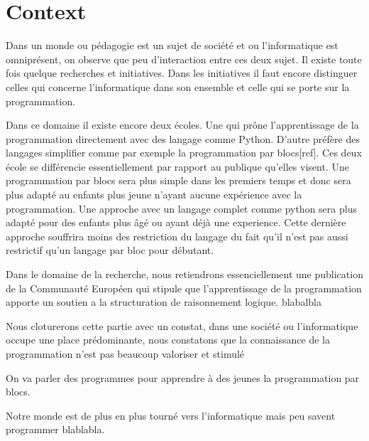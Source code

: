 \section{Context}
\label{intro-context}
Dans un monde ou pédagogie est un sujet de société et ou l'informatique est omniprésent, on observe que peu d'interaction entre ces deux sujet. Il existe toute fois quelque recherches et initiatives. Dans les initiatives il faut encore distinguer celles qui concerne l'informatique dans son ensemble et celle qui se porte sur la programmation.

Dans ce domaine il existe encore deux écoles. Une qui prône l'apprentissage de la programmation directement avec des langage comme Python. D'autre préfère des langages simplifier comme par exemple la programmation par blocs[ref]. Ces deux école se différencie essentiellement par rapport au publique qu'elles visent. Une programmation par blocs sera plus simple dans les premiers temps et donc sera plus adapté au enfants plus jeune n'ayant aucune expérience avec la programmation. Une approche avec un langage complet comme python sera plus adapté pour des enfants plus âgé ou ayant déjà une experience. Cette dernière approche souffrira moins des restriction du langage du fait qu'il n'est pas aussi restrictif qu'un langage par bloc pour débutant.

Dans le domaine de la recherche, nous retiendrons essenciellement une publication de la Communauté Européen qui stipule que l'apprentissage de la programmation apporte un soutien a la structuration de raisonnement logique. blabalbla

Nous cloturerons cette partie avec un constat, dans une société ou l'informatique occupe une place prédominante, nous constatons que la connaissance de la programmation n'est pas beaucoup valoriser et stimulé 





On va parler des programmes pour apprendre à des jeunes la programmation par blocs.

Notre monde est de plus en plus tourné vers l'informatique mais peu savent programmer blablabla.
